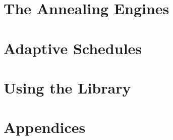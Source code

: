 \documentclass[11pt,a4paper]{report}
\begin{document}
\part{The Annealing Engines}





\part{Adaptive Schedules}


\part{Using the Library}







\appendix
\part{Appendices}

\end{document}
